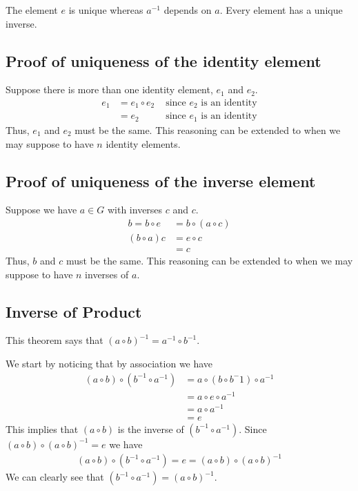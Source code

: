 \documentclass[a4paper]{article}
\begin{document}
The element \(e\) is unique whereas \(a^{-1}\) depends on \(a\). Every
element has a unique inverse.

\subsection{Proof of uniqueness of the identity element}

Suppose there is more than one identity element, \(e_1\) and \(e_2\).
\begin{align*}
    e_1 &= e_1 \circ e_2 &\text { since \(e_2\) is an identity} \\
    &= e_2 &\text { since \(e_1\) is an identity}
\end{align*}
Thus, \(e_1\) and \(e_2\) must be the same. This reasoning can be extended
to when we may suppose to have \(n\) identity elements.

\subsection{Proof of uniqueness of the inverse element}

Suppose we have \(a\in G\) with inverses \(c\) and \(c\).
\begin{align*}
    b = b \circ e &= b \circ (a \circ c)\\
    (b \circ a) c &= e \circ c \\
    &= c
\end{align*}
Thus, \(b\) and \(c\) must be the same. This reasoning can be extended
to when we may suppose to have \(n\) inverses of \(a\).


\subsection{Inverse of Product}

This theorem says that \({(a \circ b)}^{-1} = a^{-1} \circ b^{-1}\).

We start by noticing that by association we have
\begin{align*}
    (a \circ b) \circ (b^{-1} \circ a^{-1}) &= a \circ (b \circ b^-1) \circ a^{-1} \\
    &= a \circ e \circ a^{-1} \\
    &= a \circ a^{-1} \\
    &= e
\end{align*}
This implies that \((a \circ b)\) is the inverse of \((b^{-1} \circ a^{-1})\).
Since \((a\circ b) \circ {(a \circ b)}^{-1} =e\) we have
\begin{align*}
    (a \circ b) \circ (b^{-1} \circ a^{-1}) = e = (a\circ b) \circ {(a \circ b)}^{-1}
\end{align*}
We can clearly see that \((b^{-1} \circ a^{-1}) = {(a \circ b)}^{-1}\).
\end{document}
